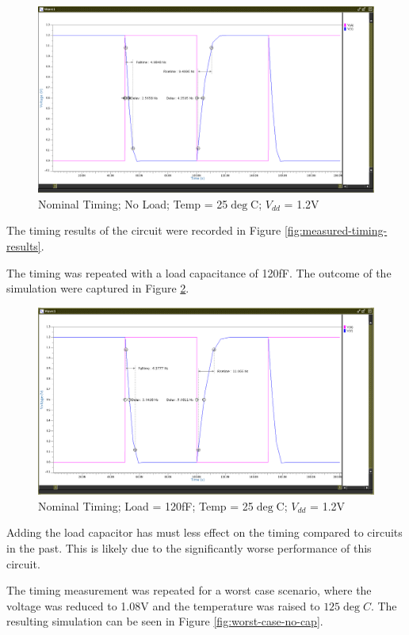 \documentclass[11pt]{article}
\begin{document}
		\begin{figure}[H]
			\centering
			\includegraphics[width=0.7\linewidth]{"Pictures/Nominal No Cap"}
			\caption{Nominal Timing; No Load; Temp = 25$\deg$C; $V_{dd}$ = 1.2V}
			\label{fig:nominal-no-cap}
		\end{figure}
	
		The timing results of the circuit were recorded in Figure \ref{fig:measured-timing-results}.
	
		The timing was repeated with a load capacitance of 120fF. The outcome of the simulation were captured in Figure \ref{fig:nominal-cap}.
		
		\begin{figure}[H]
			\centering
			\includegraphics[width=0.7\linewidth]{"Pictures/Nominal Cap"}
			\caption{Nominal Timing; Load = 120fF; Temp = 25$\deg$C; $V_{dd}$ = 1.2V}
			\label{fig:nominal-cap}
		\end{figure}
	
		Adding the load capacitor has must less effect on the timing compared to circuits in the past. This is likely due to the significantly worse performance of this circuit.
	
		The timing measurement was repeated for a worst case scenario, where the voltage was reduced to 1.08V and the temperature was raised to $125\deg C$. The resulting simulation can be seen in Figure \ref{fig:worst-case-no-cap}.
		
\end{document}
